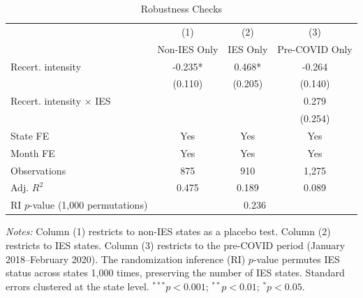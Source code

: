 \begin{table}[t]
\centering
\caption{Robustness Checks}
\label{tab:robustness}
\begin{tabular}{lccc}
\hline\hline
 & (1) & (2) & (3) \\
 & Non-IES Only & IES Only & Pre-COVID Only \\
\hline
Recert. intensity & -0.235* & 0.468* & -0.264 \\
 & (0.110) & (0.205) & (0.140) \\
Recert. intensity $\times$ IES & & & 0.279 \\
 & & & (0.254) \\
\addlinespace
State FE & Yes & Yes & Yes \\
Month FE & Yes & Yes & Yes \\
Observations & 875 & 910 & 1,275 \\
Adj. $R^2$ & 0.475 & 0.189 & 0.089 \\
\addlinespace
RI $p$-value (1,000 permutations) & \multicolumn{3}{c}{0.236} \\
\hline\hline
\end{tabular}
\begin{tablenotes}
\item \textit{Notes:} Column (1) restricts to non-IES states as a placebo test. Column (2) restricts to IES states. Column (3) restricts to the pre-COVID period (January 2018--February 2020). The randomization inference (RI) $p$-value permutes IES status across states 1,000 times, preserving the number of IES states. Standard errors clustered at the state level. $^{***}p<0.001$; $^{**}p<0.01$; $^{*}p<0.05$.
\end{tablenotes}
\end{table}

